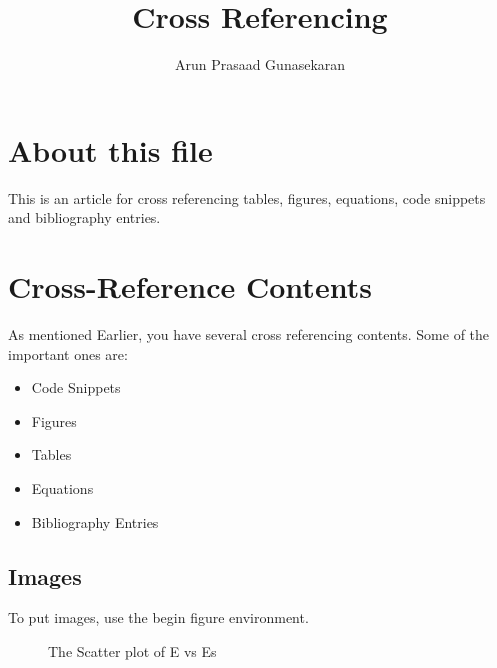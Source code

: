 \documentclass[10pt,a4paper]{article}
\author{Arun Prasaad Gunasekaran}
\title{Cross Referencing}
\begin{document}
\maketitle

\section{About this file}
This is an article for cross referencing tables, figures, equations, code snippets and bibliography entries.

\section{Cross-Reference Contents}

As mentioned Earlier, you have several cross referencing contents. Some of the important ones are:

\begin{itemize}
	\item Code Snippets
	\item Figures
	\item Tables
	\item Equations
	\item Bibliography Entries
\end{itemize}

\subsection{Images}
To put images, use the begin figure environment.

\begin{figure}
\centering
{}
\caption{The Scatter plot of E vs Es}
\label{eVSes}
\end{figure}
\end{document}
